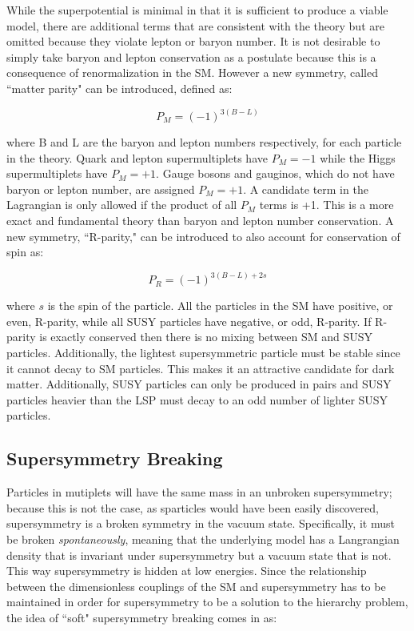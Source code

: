 While the superpotential is minimal in that it is sufficient to produce a viable model, there are additional terms that are consistent with the theory but are omitted because they violate lepton or baryon number.  It is not desirable to simply take baryon and lepton conservation as a postulate because this is a consequence of renormalization in the SM.  However a new symmetry, called ``matter parity" can be introduced, defined as:

\begin{equation}
P_{M} = (-1)^{3(B-L)}
\end{equation}

where B and L are the baryon and lepton numbers respectively, for each particle in the theory.  Quark and lepton supermultiplets have $P_M=-1$ while the Higgs supermultiplets have $P_M=+1$.  Gauge bosons and gauginos, which do not have baryon or lepton number, are assigned $P_M=+1$.  A candidate term in the Lagrangian is only allowed if the product of all $P_M$ terms is +1.  This is a more exact and fundamental theory than baryon and lepton number conservation.  A new symmetry, ``R-parity," can be introduced to also account for conservation of spin as:

\begin{equation}
P_{R} = (-1)^{3(B-L) + 2s}
\end{equation}

where $s$ is the spin of the particle.  All the particles in the SM have positive, or even, R-parity, while all SUSY particles have negative, or odd, R-parity.  If R-parity is exactly conserved then there is no mixing between SM and SUSY particles.  Additionally, the lightest supersymmetric particle must be stable since it cannot decay to SM particles.  This makes it an attractive candidate for dark matter.  Additionally, SUSY particles can only be produced in pairs and SUSY particles heavier than the LSP must decay to an odd number of lighter SUSY particles. 


\subsection{Supersymmetry Breaking}

Particles in mutiplets will have the same mass in an unbroken supersymmetry; because this is not the case, as sparticles would have been easily discovered, supersymmetry is a broken symmetry in the vacuum state.  Specifically, it must be broken \textit{spontaneously}, meaning that the underlying model has a Langrangian density that is invariant under supersymmetry but a vacuum state that is not.  This way supersymmetry is hidden at low energies.  Since the relationship between the dimensionless couplings of the SM and supersymmetry has to be maintained in order for supersymmetry to be a solution to the hierarchy problem, the idea of ``soft" supersymmetry breaking comes in as: 


